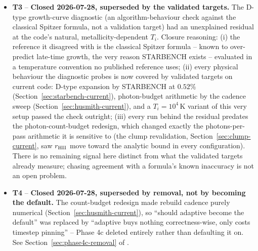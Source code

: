 \begin{itemize}
  \item[$\blacksquare$] \textbf{T3} -- \textbf{Closed 2026-07-28,
    superseded by the validated targets.} The 
    D-type growth-curve diagnostic (an algorithm-behaviour check
    against the classical Spitzer formula, not a validation target)
    had an unexplained residual at the code's natural,
    metallicity-dependent $T_i$. Closure reasoning: (i) the reference
    it disagreed with is the classical Spitzer formula -- known to
    over-predict late-time growth, the very reason STARBENCH exists --
    evaluated in a temperature convention no published reference uses;
    (ii) every physical behaviour the diagnostic probes is now covered
    by validated targets on current code: D-type expansion by STARBENCH
    at $0.52\%$ (Section~\ref{sec:starbench-current}), photon-budget
    arithmetic by the cadence sweep
    (Section~\ref{sec:husmith-current}), and a $T_i=10^4\,$K variant of
    this very setup passed the check outright; (iii) every run behind
    the residual predates the photon-count-budget redesign, which
    changed exactly the photons-per-pass arithmetic it is sensitive to
    (the clump revalidation, Section~\ref{sec:clump-current}, saw
    $r_{\rm HII}$ move toward the analytic bound in every
    configuration). There is no remaining signal here distinct from
    what the validated targets already measure; chasing agreement with
    a formula's known inaccuracy is not an open problem.

  \item[$\blacksquare$] \textbf{T4} -- \textbf{Closed 2026-07-28, superseded
    by removal, not by becoming the default.} The count-budget redesign
    made rebuild cadence purely numerical (Section~\ref{sec:husmith-current}),
    so ``should adaptive become the default'' was replaced by ``adaptive
    buys nothing correctness-wise, only costs timestep pinning'' -- Phase 4c
    deleted  entirely rather than
    defaulting it on. See Section~\ref{sec:phase4c-removal} of
    .


\end{itemize}
